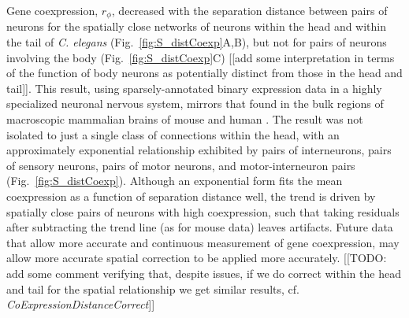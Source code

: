 \documentclass[10pt,letterpaper]{article}
\begin{document}
Gene coexpression, $r_\phi$, decreased with the separation distance between pairs of neurons for the spatially close networks of neurons within the head and within the tail of \emph{C. elegans} (Fig.~\ref{fig:S_distCoexp}A,B), but not for pairs of neurons involving the body (Fig.~\ref{fig:S_distCoexp}C) [[add some interpretation in terms of the function of body neurons as potentially distinct from those in the head and tail]].
This result, using sparsely-annotated binary expression data in a highly specialized neuronal nervous system, mirrors that found in the bulk regions of macroscopic mammalian brains of mouse \cite{Fulcher:2016ck} and human \cite{Krienen:2016eq}.
The result was not isolated to just a single class of connections within the head, with an approximately exponential relationship exhibited by pairs of interneurons, pairs of sensory neurons, pairs of motor neurons, and motor-interneuron pairs (Fig.~\ref{fig:S_distCoexp}).
Although an exponential form fits the mean coexpression as a function of separation distance well, the trend is driven by spatially close pairs of neurons with high coexpression, such that taking residuals after subtracting the trend line (as \citet{Fulcher:2016ck} for mouse data) leaves artifacts.
Future data that allow more accurate and continuous measurement of gene coexpression, may allow more accurate spatial correction to be applied more accurately.
[[TODO: add some comment verifying that, despite issues, if we do correct within the head and tail for the spatial relationship we get similar results, cf. \emph{CoExpressionDistanceCorrect}]]
\end{document}

